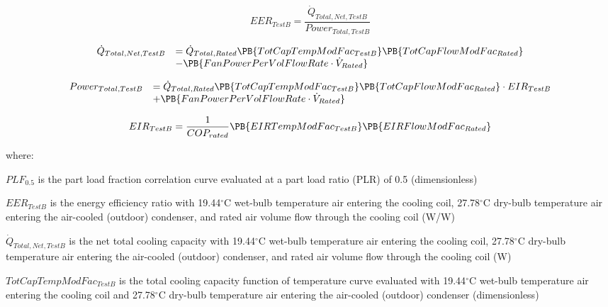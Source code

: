 \begin{equation}
EE{R_{TestB}} = \frac{{{{\dot Q}_{Total,Net,TestB}}}}{{Powe{r_{Total,TestB}}}}
\end{equation}

\begin{equation}
  \begin{array}{rl}
    \dot{Q}_{Total,Net,TestB} &= \dot{Q}_{Total,Rated} \PB{TotCapTempModFac_{TestB}}\PB{TotCapFlowModFac_{Rated}} \\
                              &- \PB{FanPowerPerVolFlowRate \cdot \dot{V}_{Rated}}
  \end{array}
\end{equation}

\begin{equation}
  \begin{array}{rl}
    Power_{Total,TestB} &= \dot{Q}_{Total,Rated} \PB{TotCapTempModFac_{TestB}}\PB{TotCapFlowModFac_{Rated}}\cdot EIR_{TestB} \\
                        &+ \PB{FanPowerPerVolFlowRate \cdot \dot{V}_{Rated}}
  \end{array}
\end{equation}

\begin{equation}
  EIR_{TestB} = \frac{1}{COP_{rated}}\PB{EIRTempModFac_{TestB}}\PB{EIRFlowModFac_{Rated}}
\end{equation}

where:

\(PLF_{0.5}\) is the part load fraction correlation curve evaluated at a part load ratio (PLR) of 0.5 (dimensionless)

\(EER_{TestB}\) is the energy efficiency ratio with 19.44\(^{\circ}\)C wet-bulb temperature air entering the cooling coil, 27.78\(^{\circ}\)C dry-bulb temperature air entering the air-cooled (outdoor) condenser, and rated air volume flow through the cooling coil (W/W)

\({\dot Q_{Total,Net,TestB}}\) is the net total cooling capacity with 19.44\(^{\circ}\)C wet-bulb temperature air entering the cooling coil, 27.78\(^{\circ}\)C dry-bulb temperature air entering the air-cooled (outdoor) condenser, and rated air volume flow through the cooling coil (W)

\(TotCapTempModFa{c_{TestB}}\) is the total cooling capacity function of temperature curve evaluated with 19.44\(^{\circ}\)C wet-bulb temperature air entering the cooling coil and 27.78\(^{\circ}\)C dry-bulb temperature air entering the air-cooled (outdoor) condenser (dimensionless)

